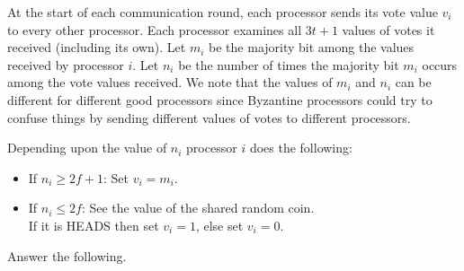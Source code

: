 \documentclass[11pt]{article}
\begin{document}
At the start of each communication round, each processor sends its vote value $v_i$
to every other processor. Each processor examines all $3t + 1$ values of votes
it received (including its own). 
Let $m_i$ be the majority bit among
the values received by processor $i$. Let $n_i$ be the number of times the majority bit $m_i$ occurs among
the vote values received. We note that the values of $m_i$ and $n_i$ can be different for different good processors since  Byzantine processors could try to confuse things
by sending different values of votes to different processors.

Depending upon the value of $n_i$ 
processor $i$ does the following:
\begin{itemize}
\item If $n_i \geq 2f+1$: Set  $v_i = m_i$.
\item If $n_i \leq 2f$: See the value of the shared random coin. \\ If it is HEADS then
set $v_i = 1$, else set $v_i  = 0$.
\end{itemize}

Answer the following.
\end{document}
